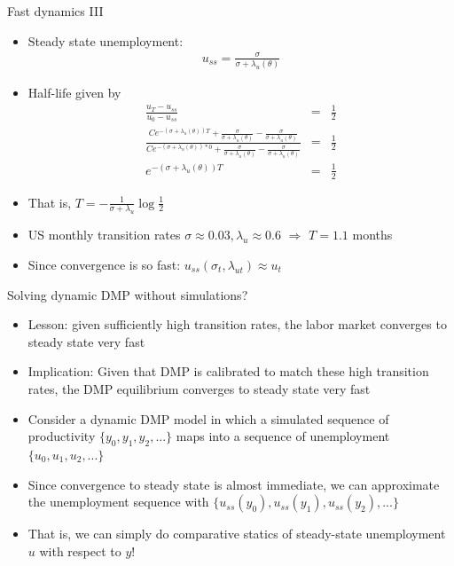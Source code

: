 \documentclass[9pt]{beamer}
\newcommand{\bit}{\begin{itemize}}
\newcommand{\eit}{\end{itemize}}
\begin{document}
\begin{frame}{Fast dynamics III}

\bit
\setlength\itemsep{1.5em}

\item Steady state unemployment:
\begin{eqnarray}
u_{ss} = \frac{\sigma}{\sigma + \lambda_u(\theta)} \nonumber 
\end{eqnarray}


\item Half-life given by
\begin{eqnarray}
\frac{u_T-u_{ss}}{u_0-u_{ss}} &=& \frac{1}{2} \nonumber  \\
\frac{C e^{-(\sigma + \lambda_u(\theta))T}+\frac{\sigma}{\sigma + \lambda_u(\theta)}-\frac{\sigma}{\sigma + \lambda_u(\theta)}}{C e^{-(\sigma + \lambda_u(\theta))*0}+\frac{\sigma}{\sigma + \lambda_u(\theta)}-\frac{\sigma}{\sigma + \lambda_u(\theta)}}  &=& \frac{1}{2} \nonumber \\
e^{-(\sigma + \lambda_u(\theta))T} &=& \frac{1}{2} \nonumber
\end{eqnarray}

\item That is, $T = - \frac{1}{\sigma + \lambda_u} \log \frac{1}{2}$

\item US monthly transition rates $\sigma \approx 0.03 , \lambda_u \approx 0.6$ $\Rightarrow$  $T=1.1$ months

\item Since convergence is so fast: $u_{ss}(\sigma_t, \lambda_{ut}) \approx u_t$


\eit
\end{frame}

\begin{frame}{Solving dynamic DMP without simulations?}

\bit
\setlength\itemsep{2em}

\item Lesson: given sufficiently high transition rates, the labor market converges to steady state very fast

\item Implication: Given that DMP is calibrated to match these high transition rates, the DMP equilibrium converges to steady state very fast

\item Consider a dynamic DMP model in which a simulated sequence of productivity $\{y_0, y_1, y_2,...\}$ maps into a sequence of unemployment $\{u_0, u_1, u_2,...\}$

\item Since convergence to steady state is almost immediate, we can approximate the unemployment sequence with $\{u_{ss}(y_0), u_{ss}(y_1), u_{ss}(y_2),...\}$

\item That is, we can simply do comparative statics of steady-state unemployment $u$ with respect to $y$!


\eit
\end{frame}
\end{document}
